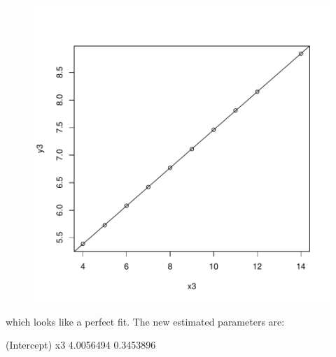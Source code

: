 \documentclass[12pt]{article}
\begin{document}
\begin{itemize}
\begin{figure}[H]
\includegraphics{HW6-026}
\end{figure}

which looks like a perfect fit. The new estimated parameters are:
\begin{Schunk}
\begin{Soutput}
(Intercept)          x3 
  4.0056494   0.3453896 
\end{Soutput}
\end{Schunk}
\clearpage


\end{itemize}
\end{document}
